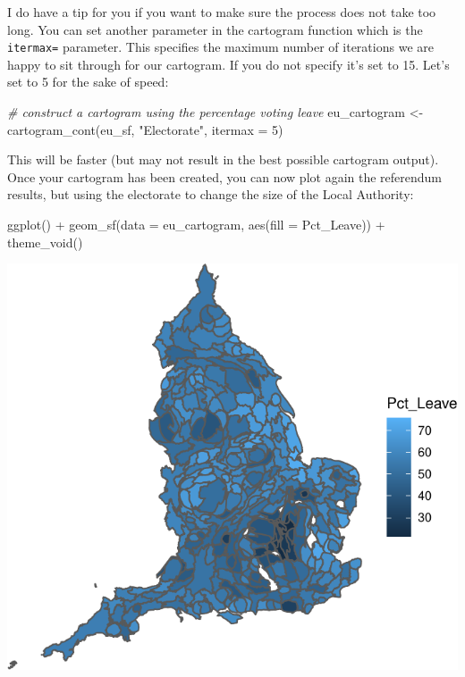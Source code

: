 \documentclass[
]{book}
\makeatletter
\newenvironment{Shaded}{\begin{snugshade}}{\end{snugshade}}
\newcommand{\AttributeTok}[1]{\textcolor[rgb]{0.61,0.61,0.61}{#1}}
\newcommand{\CommentTok}[1]{\textcolor[rgb]{0.37,0.37,0.37}{\textit{#1}}}
\newcommand{\DecValTok}[1]{\textcolor[rgb]{0.06,0.06,0.06}{#1}}
\newcommand{\FunctionTok}[1]{\textcolor[rgb]{0,0,0}{#1}}
\newcommand{\NormalTok}[1]{#1}
\newcommand{\OtherTok}[1]{\textcolor[rgb]{0.37,0.37,0.37}{#1}}
\newcommand{\SpecialCharTok}[1]{\textcolor[rgb]{0,0,0}{#1}}
\newcommand{\StringTok}[1]{\textcolor[rgb]{0.5,0.5,0.5}{#1}}
\newenvironment{kframe}{%
\medskip{}
\setlength{\fboxsep}{.8em}
 \def\at@end@of@kframe{}%
 \ifinner\ifhmode%
  \def\at@end@of@kframe{\end{minipage}}%
  \begin{minipage}{\columnwidth}%
 \fi\fi%
 \def\FrameCommand##1{\hskip\@totalleftmargin \hskip-\fboxsep
 \colorbox{shadecolor}{##1}\hskip-\fboxsep
     \hskip-\linewidth \hskip-\@totalleftmargin \hskip\columnwidth}%
 \MakeFramed {\advance\hsize-\width
   \@totalleftmargin\z@ \linewidth\hsize
   \@setminipage}}%
 {\par\unskip\endMakeFramed%
 \at@end@of@kframe}
\renewenvironment{Shaded}{\begin{kframe}}{\end{kframe}}
\makeatother
\begin{document}
I do have a tip for you if you want to make sure the process does not take too long. You can set another parameter in the cartogram function which is the \texttt{itermax=} parameter. This specifies the maximum number of iterations we are happy to sit through for our cartogram. If you do not specify it's set to 15. Let's set to 5 for the sake of speed:

\begin{Shaded}
\begin{Highlighting}[]
\CommentTok{\# construct a cartogram using the percentage voting leave}
\NormalTok{eu\_cartogram }\OtherTok{\textless{}{-}} \FunctionTok{cartogram\_cont}\NormalTok{(eu\_sf, }\StringTok{"Electorate"}\NormalTok{, }\AttributeTok{itermax =} \DecValTok{5}\NormalTok{)}
\end{Highlighting}
\end{Shaded}

This will be faster (but may not result in the best possible cartogram output). Once your cartogram has been created, you can now plot again the referendum results, but using the electorate to change the size of the Local Authority:

\begin{Shaded}
\begin{Highlighting}[]
\FunctionTok{ggplot}\NormalTok{() }\SpecialCharTok{+}
  \FunctionTok{geom\_sf}\NormalTok{(}\AttributeTok{data =}\NormalTok{ eu\_cartogram, }\FunctionTok{aes}\NormalTok{(}\AttributeTok{fill =}\NormalTok{ Pct\_Leave)) }\SpecialCharTok{+} 
  \FunctionTok{theme\_void}\NormalTok{()}
\end{Highlighting}
\end{Shaded}

\includegraphics{crime_mapping_files/figure-latex/unnamed-chunk-137-1.pdf}
\end{document}
